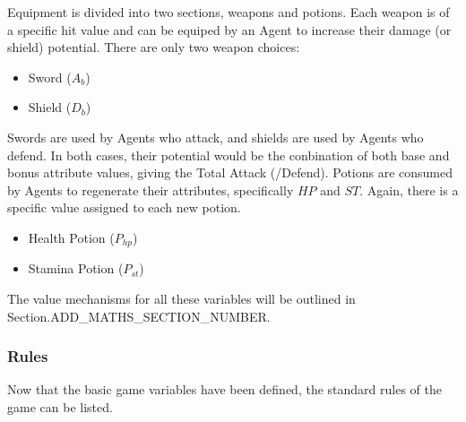 Equipment is divided into two sections, weapons and potions. Each weapon is of a specific hit value and can be equiped by an Agent to increase their damage (or shield) potential. There are only two weapon choices:

\begin{itemize}
    \item Sword ($A_b$)
    \item Shield ($D_b$)
\end{itemize}

Swords are used by Agents who attack, and shields are used by Agents who defend. In both cases, their potential would be the conbination of both base and bonus attribute values, giving the Total Attack (/Defend). Potions are consumed by Agents to regenerate their attributes, specifically $HP$ and $ST$. Again, there is a specific value assigned to each new potion. 

\begin{itemize}
    \item Health Potion ($P_{hp}$)
    \item Stamina Potion ($P_{st}$)
\end{itemize}

The value mechanisms for all these variables will be outlined in Section.ADD_MATHS_SECTION_NUMBER. \\

\subsubsection{Rules}
Now that the basic game variables have been defined, the standard rules of the game can be listed. 

